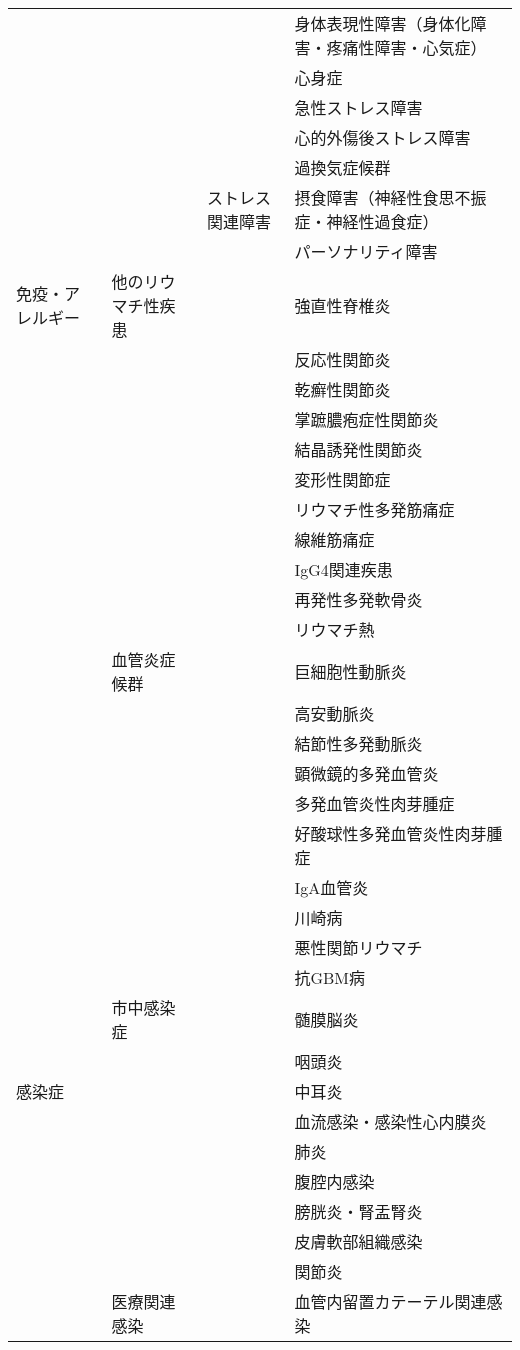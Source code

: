 \begin{xltabular}{\linewidth}{XXXX}
 &  &  & 身体表現性障害（身体化障害・疼痛性障害・心気症） \\
 &  &  & 心身症 \\
 &  &  & 急性ストレス障害 \\
 &  &  & 心的外傷後ストレス障害 \\
 &  &  & 過換気症候群 \\
 &  & ストレス関連障害 & 摂食障害（神経性食思不振症・神経性過食症） \\
 &  &  & パーソナリティ障害 \\
免疫・アレルギー & 他のリウマチ性疾患 &  & 強直性脊椎炎 \\
 &  &  & 反応性関節炎 \\
 &  &  & 乾癬性関節炎 \\
 &  &  & 掌蹠膿疱症性関節炎 \\
 &  &  & 結晶誘発性関節炎 \\
 &  &  & 変形性関節症 \\
 &  &  & リウマチ性多発筋痛症 \\
 &  &  & 線維筋痛症 \\
 &  &  & IgG4関連疾患 \\
 &  &  & 再発性多発軟骨炎 \\
 &  &  & リウマチ熱 \\
 & 血管炎症候群 &  & 巨細胞性動脈炎 \\
 &  &  & 高安動脈炎 \\
 &  &  & 結節性多発動脈炎 \\
 &  &  & 顕微鏡的多発血管炎 \\
 &  &  & 多発血管炎性肉芽腫症 \\
 &  &  & 好酸球性多発血管炎性肉芽腫症 \\
 &  &  & IgA血管炎 \\
 &  &  & 川崎病 \\
 &  &  & 悪性関節リウマチ \\
 &  &  & 抗GBM病 \\
 & 市中感染症 &  & 髄膜脳炎 \\
 &  &  & 咽頭炎 \\
感染症 &  &  & 中耳炎 \\
 &  &  & 血流感染・感染性心内膜炎 \\
 &  &  & 肺炎 \\
 &  &  & 腹腔内感染 \\
 &  &  & 膀胱炎・腎盂腎炎 \\
 &  &  & 皮膚軟部組織感染 \\
 &  &  & 関節炎 \\
 & 医療関連感染 &  & 血管内留置カテーテル関連感染 \\

\end{xltabular}
